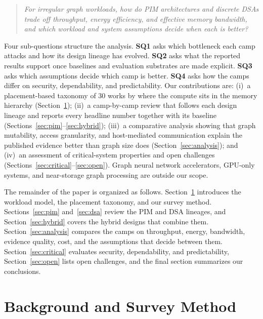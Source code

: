 \documentclass[journal,onecolumn]{IEEEtran}
\begin{document}
\begin{quote}\itshape
For irregular graph workloads, how do PIM architectures and discrete DSAs trade off throughput, energy efficiency, and effective memory bandwidth, and which workload and system assumptions decide when each is better?
\end{quote}

Four sub-questions structure the analysis. \textbf{SQ1} asks which bottleneck each camp attacks and how its design lineage has evolved. \textbf{SQ2} asks what the reported results support once baselines and evaluation substrates are made explicit. \textbf{SQ3} asks which assumptions decide which camp is better. \textbf{SQ4} asks how the camps differ on security, dependability, and predictability. Our contributions are:
(i)~a placement-based taxonomy of 30 works by where the compute sits in the memory hierarchy (Section~\ref{sec:background});
(ii)~a camp-by-camp review that follows each design lineage and reports every headline number together with its baseline (Sections~\ref{sec:pim}--\ref{sec:hybrid});
(iii)~a comparative analysis showing that graph mutability, access granularity, and host-mediated communication explain the published evidence better than graph size does (Section~\ref{sec:analysis});
and (iv)~an assessment of critical-system properties and open challenges (Sections~\ref{sec:critical}--\ref{sec:open}).
Graph neural network accelerators, GPU-only systems, and near-storage graph processing are outside our scope.

The remainder of the paper is organized as follows. Section~\ref{sec:background} introduces the workload model, the placement taxonomy, and our survey method. Sections~\ref{sec:pim} and~\ref{sec:dsa} review the PIM and DSA lineages, and Section~\ref{sec:hybrid} covers the hybrid designs that combine them. Section~\ref{sec:analysis} compares the camps on throughput, energy, bandwidth, evidence quality, cost, and the assumptions that decide between them. Section~\ref{sec:critical} evaluates security, dependability, and predictability, Section~\ref{sec:open} lists open challenges, and the final section summarizes our conclusions.

\section{Background and Survey Method}\label{sec:background}
\end{document}
